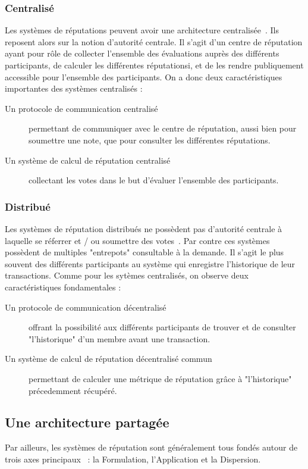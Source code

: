 \documentclass[a4paper, 11pt]{article} %
\begin{document}
\subsubsection{Centralisé}
Les systèmes de réputations peuvent avoir une architecture centralisée~\cite{JosangIsmailBoyd2007}.
Ils reposent alors sur la notion d'autorité centrale.
Il s'agit d'un centre de réputation ayant pour rôle de collecter l'ensemble des évaluations auprès des différents participants, de calculer les différentes réputationsi, et de les rendre publiquement accessible pour l'ensemble des participants.
On a donc deux caractéristiques importantes des systèmes centralisés :
\begin{description}
	\item[Un protocole de communication centralisé]permettant de communiquer avec le centre de réputation, aussi bien pour soumettre une note, que pour consulter les différentes réputations.
	\item[Un système de calcul de réputation centralisé]collectant les votes dans le but d'évaluer l'ensemble des participants.
\end{description}

\subsubsection{Distribué}
Les systèmes de réputation distribués ne possèdent pas d'autorité centrale à laquelle se réferrer et / ou soumettre des votes~\cite{JosangIsmailBoyd2007}.
Par contre ces systèmes possèdent de multiples "entrepots" consultable à la demande.
Il s'agit le plus souvent des différents participants au système qui enregistre l'historique de leur transactions.
Comme pour les sytèmes centralisés, on observe deux caractéristiques fondamentales :
\begin{description}
	\item[Un protocole de communication décentralisé]offrant la possibilité aux différents participants de trouver et de consulter "l'historique" d'un membre avant une transaction.
	\item[Un système de calcul de réputation décentralisé commun]permettant de calculer une métrique de réputation grâce à "l'historique" précedemment récupéré.
\end{description}

\subsection{Une architecture partagée}
Par ailleurs, les systèmes de réputation sont généralement tous fondés autour de trois axes principaux~\cite{HoffmanZageNita2007} : la Formulation, l'Application et la Dispersion.
\end{document}
